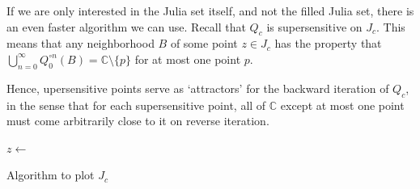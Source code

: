 \documentclass[symmetric]{tufte-handout}
\begin{document}
If we are only interested in the Julia set itself, and not the filled Julia set,
there is an even faster algorithm we can use.
Recall that $Q_c$ is supersensitive on $J_c$. 
This means that any neighborhood $B$ of some point $z\in J_c$ has
the property that 
$\bigcup_{n=0}^\infty Q_0^{\circ n} (B) = \mathbb{C} \setminus \{p\}$ for at most one point $p$.

\vspace{.4cm}

Hence, upersensitive points serve as `attractors' for the backward iteration of $Q_c$, 
in the sense that for each supersensitive point, all of $\mathbb{C}$ except at most one point
must come arbitrarily close to it on reverse iteration. 

\vspace{1cm}
\begin{algorithm}[H]
  \DontPrintSemicolon
  \LinesNumbered
{}


$z \leftarrow $ \KwRandC{}\;

\caption{Algorithm to plot $J_c$ }

\end{algorithm}
\end{document}
